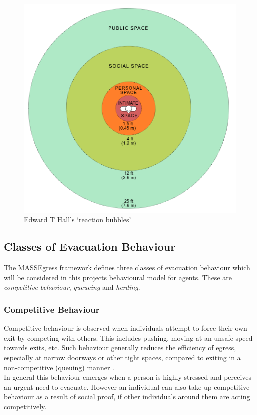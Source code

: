 \begin{figure}
\centering
\includegraphics[scale=0.4]{../images/Personal_Space.png}
\caption{Edward T Hall's `reaction bubbles'}
\label{fig:personalSpace}
\end{figure}


\subsection{Classes of Evacuation Behaviour}
\label{Res:subsec:behaviourClasses}
The MASSEgress framework \cite{MultiAgentFramework,PanMASSEgressThesis,IndivBehaviourPseudo} defines three classes of evacuation behaviour which will be considered in this projects behavioural model for agents. These are \emph{competitive behaviour}, \emph{queueing} and \emph{herding}.

\subsubsection{Competitive Behaviour}
\label{Res:subsubsec:competitive}
Competitive behaviour is observed when individuals attempt to force their own exit by competing with others. This includes pushing, moving at an unsafe speed towards exits, etc. Such behaviour generally reduces the efficiency of egress, especially at narrow doorways or other tight spaces\cite{BottleneckStudy}, compared to exiting in a non-competitive (queuing) manner \cite{EgressBehaviourKirchner}.\\
In general this behaviour emerges when a person is highly stressed and perceives an urgent need to evacuate. However an individual can also take up competitive behaviour as a result of social proof, if other individuals around them are acting competitively.
